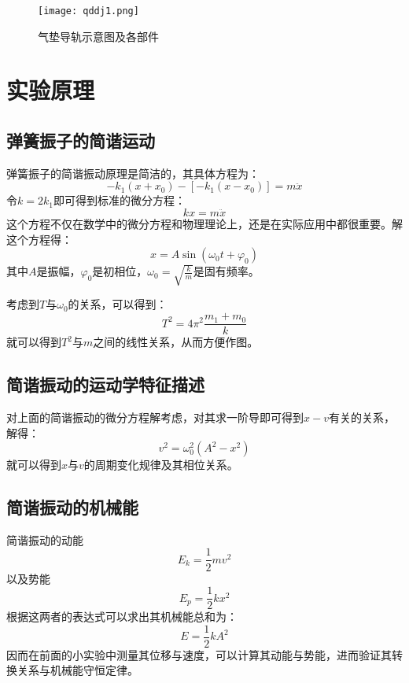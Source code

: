 \documentclass[11pt]{article}
\begin{document}
\begin{figure}[htbp]
    \centering
    \texttt{[image: qddj1.png]}
    \caption{气垫导轨示意图及各部件}
\end{figure}

\section{实验原理}

\subsection{弹簧振子的简谐运动}

弹簧振子的简谐振动原理是简洁的，其具体方程为：\begin{displaymath}-k_1(x+x_0)-[-k_1(x-x_0)]=m\ddot x\end{displaymath}令$k=2k_1$即可得到标准的微分方程：\begin{displaymath}kx=m\ddot x\end{displaymath}这个方程不仅在数学中的微分方程和物理理论上，还是在实际应用中都很重要。解这个方程得：\begin{displaymath}x=A\sin (\omega_0t+\varphi_0)\end{displaymath}其中$A$是振幅，$\varphi_0$是初相位，$\displaystyle \omega_0=\sqrt{\frac{k}{m}}$是固有频率。

考虑到$T$与$\omega_0$的关系，可以得到：\begin{displaymath}T^2=4\pi^2\frac{m_1+m_0}{k}\end{displaymath}就可以得到$T^2$与$m$之间的线性关系，从而方便作图。

\subsection{简谐振动的运动学特征描述}

对上面的简谐振动的微分方程解考虑，对其求一阶导即可得到$x-v$有关的关系，解得：\begin{displaymath}v^2=\omega_0^2(A^2-x^2)\end{displaymath}就可以得到$x$与$v$的周期变化规律及其相位关系。

\subsection{简谐振动的机械能}

简谐振动的动能\begin{displaymath}E_k=\frac{1}{2}mv^2\end{displaymath}以及势能\begin{displaymath}E_p=\frac{1}{2}kx^2\end{displaymath}根据这两者的表达式可以求出其机械能总和为：\begin{displaymath}E=\frac{1}{2}kA^2\end{displaymath}因而在前面的小实验中测量其位移与速度，可以计算其动能与势能，进而验证其转换关系与机械能守恒定律。
\end{document}
